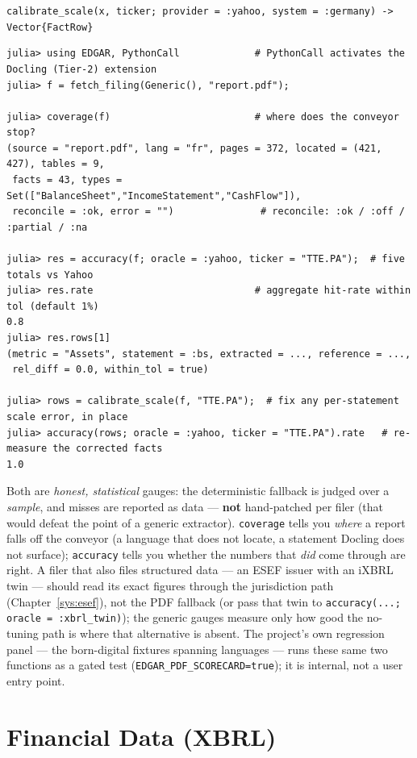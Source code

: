 \documentclass[11pt,a4paper]{report}
\newcommand{\sig}[1]{\medskip\noindent\texttt{#1}\par\medskip}
\begin{document}
\sig{calibrate\_scale(x, ticker; provider = :yahoo, system = :germany) -> Vector\{FactRow\}}

\begin{lstlisting}
julia> using EDGAR, PythonCall             # PythonCall activates the Docling (Tier-2) extension
julia> f = fetch_filing(Generic(), "report.pdf");

julia> coverage(f)                         # where does the conveyor stop?
(source = "report.pdf", lang = "fr", pages = 372, located = (421, 427), tables = 9,
 facts = 43, types = Set(["BalanceSheet","IncomeStatement","CashFlow"]),
 reconcile = :ok, error = "")               # reconcile: :ok / :off / :partial / :na

julia> res = accuracy(f; oracle = :yahoo, ticker = "TTE.PA");  # five totals vs Yahoo
julia> res.rate                            # aggregate hit-rate within tol (default 1%)
0.8
julia> res.rows[1]
(metric = "Assets", statement = :bs, extracted = ..., reference = ...,
 rel_diff = 0.0, within_tol = true)

julia> rows = calibrate_scale(f, "TTE.PA");  # fix any per-statement scale error, in place
julia> accuracy(rows; oracle = :yahoo, ticker = "TTE.PA").rate   # re-measure the corrected facts
1.0
\end{lstlisting}

Both are \emph{honest, statistical} gauges: the deterministic fallback is judged over a \emph{sample}, and
misses are reported as data --- \textbf{not} hand-patched per filer (that would defeat the point of a generic
extractor). \texttt{coverage} tells you \emph{where} a report falls off the conveyor (a language that does not
locate, a statement Docling does not surface); \texttt{accuracy} tells you whether the numbers that \emph{did}
come through are right. A filer that also files structured data --- an ESEF issuer with an iXBRL twin --- should
read its exact figures through the jurisdiction path (Chapter~\ref{sys:esef}), not the PDF fallback (or pass
that twin to \texttt{accuracy(...; oracle = :xbrl\_twin)}); the generic gauges measure only how good the
no-tuning path is where that alternative is absent. The project's own regression panel --- the born-digital
fixtures spanning languages --- runs these same two functions as a gated test (\texttt{EDGAR\_PDF\_SCORECARD=true});
it is internal, not a user entry point.

\section{Financial Data (XBRL)}
\label{sec:api-xbrl}
\end{document}
